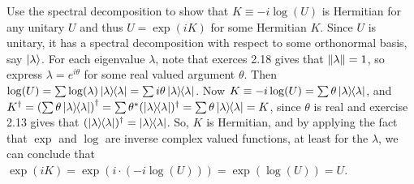  Use the spectral decomposition to show that $K\equiv-i\log(U)$ is Hermitian for any unitary $U$ and thus $U=\exp(iK)$ for some Hermitian $K$.
\Soln Since $U$ is unitary, it has a spectral decomposition with respect to some orthonormal basis, say $\ket{\lambda}$.  For each eigenvalue $\lambda$, note that exerces 2.18 gives that $\left\lVert\lambda\right\rVert = 1$, so express $\lambda=e^{i\theta}$ for some real valued argument $\theta$.  Then $\log(U) = \sum \log(\lambda)\ket{\lambda}\hspace{-1mm} \bra{\lambda}=\sum i\theta\ket{\lambda}\hspace{-1mm} \bra{\lambda}$.  Now $K \equiv -i\log(U) = \sum \theta \ket{\lambda}\hspace{-1mm} \bra{\lambda}$, and $K^\dagger = \left(\sum \theta\ket{\lambda}\hspace{-1mm} \bra{\lambda}\right)^\dagger = \sum \theta^*(\ket{\lambda}\hspace{-1mm} \bra{\lambda})^\dagger= \sum \theta\ket{\lambda}\hspace{-1mm} \bra{\lambda} = K$, since $\theta$ is real and exercise 2.13 gives that $(\ket{\lambda}\hspace{-1mm} \bra{\lambda})^\dagger=\ket{\lambda}\hspace{-1mm} \bra{\lambda}$.  So, $K$ is Hermitian, and by applying the fact that $\exp$ and $\log$ are inverse complex valued functions, at least for the $\lambda$, we can conclude that $\exp(iK)=\exp(i\cdot(-i\log(U))) = \exp(\log(U)) = U$.

%



